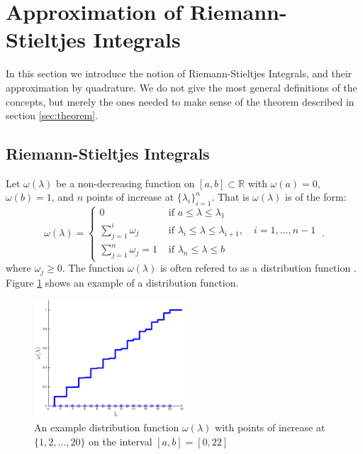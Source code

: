 \documentclass[10pt,a4paper]{article}
\begin{document}
\section{Approximation of Riemann-Stieltjes Integrals} \label{sec:quad}

In this section we introduce the notion of Riemann-Stieltjes Integrals, and their approximation by quadrature. We do not give the most general definitions of the concepts, but merely the ones needed to make sense of the theorem described in section \ref{sec:theorem}.
\subsection{Riemann-Stieltjes Integrals}
Let $\omega(\lambda)$ be a non-decreasing function on $\left[ a , b \right] \subset \mathbb{R}$ with $\omega(a) =0$, $\omega(b) =1$, and  $n$ points of increase at $\{ \lambda_i \}_{i=1}^n $. That is $\omega(\lambda)$ is of the form:
\begin{equation} 
\omega(\lambda) = \begin{cases}
0 & \text{ if } a \leq \lambda \leq \lambda_1   \\
\sum_{j=1}^i \omega_j & \text{ if } \lambda_i \leq \lambda \leq \lambda_{i+1},   \quad i = 1,\dots,n-1   \\
\sum_{j=1}^n \omega_j = 1 & \text{ if } \lambda_n \leq \lambda \leq b     
\end{cases} \ .
\end{equation} 
where $\omega_j \geq 0 $. The function $\omega(\lambda)$ is often refered to as a distribution function \cite{liesen_strakoss_zdenek_2013}. Figure \ref{fig:exdist} shows an example of a distribution function.

\begin{figure}[h]
  \centering
\includegraphics[width = 0.5\textwidth]{distrib}
  \caption{An example distribution function $\omega(\lambda)$  \label{fig:exdist} with points of increase at $\{ 1, 2, \dots , 20 \}$ on the interval $\left[ a , b \right] = \left[ 0, 22 \right]$ }
\end{figure}
\end{document}
